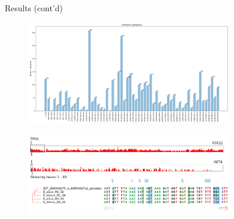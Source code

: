 \documentclass{beamer}
\begin{document}
\begin{frame}{Results (cont'd)}
	\begin{figure}[ht]
		\centering
		\includegraphics[width=0.8\textwidth,height=0.3\textheight]{img/Clostridium-sporogenes.png}
		\caption*{\label{fig:Clostridium-hist}}
	\end{figure}
	\vspace{-1cm}
	\begin{figure}[ht]
		\centering
		\includegraphics[width=0.8\textwidth,height=0.4\textheight]{img/Clostridium-sporogenes-msa.png}
		\caption*{\label{fig:Clostridium-msa}}
	\end{figure}
\end{frame}
\end{document}

